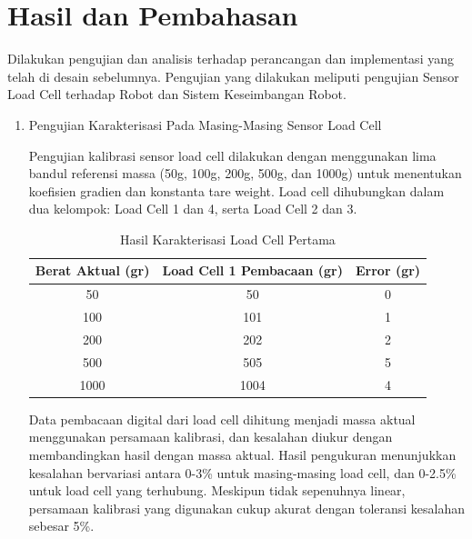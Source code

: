 \section{Hasil dan Pembahasan}
\label{sec:hasildanpembahasan}

Dilakukan pengujian dan analisis terhadap perancangan dan implementasi yang telah di desain sebelumnya. Pengujian yang dilakukan meliputi pengujian Sensor Load Cell terhadap Robot dan Sistem Keseimbangan Robot. 

\begin{enumerate}[label=\Alph*.]

    \item Pengujian Karakterisasi Pada Masing-Masing Sensor Load Cell
    \label{subsec:hasil-pembahasan-karakterisasi}

        \hspace*{1em} Pengujian kalibrasi sensor load cell dilakukan dengan menggunakan lima bandul referensi massa (50g, 100g, 200g, 500g, dan 1000g) untuk menentukan koefisien gradien dan konstanta tare weight. Load cell dihubungkan dalam dua kelompok: Load Cell 1 dan 4, serta Load Cell 2 dan 3. 

        \begin{table}[h]
            \centering
            \caption{Hasil Karakterisasi Load Cell Pertama}
            \begin{tabular}{|c|c|c|}
                \hline
                \textbf{Berat Aktual (gr)} & \textbf{Load Cell 1 Pembacaan (gr)} & \textbf{Error (gr)} \\
                \hline
                50    & 50    & 0   \\
                100   & 101   & 1   \\
                200   & 202   & 2   \\
                500   & 505   & 5   \\
                1000  & 1004  & 4   \\
                \hline
            \end{tabular}
            \label{tab:Kalibrasi_Load_Cell_1}
        \end{table}
        
        \hspace*{1em} Data pembacaan digital dari load cell dihitung menjadi massa aktual menggunakan persamaan kalibrasi, dan kesalahan diukur dengan membandingkan hasil dengan massa aktual. Hasil pengukuran menunjukkan kesalahan bervariasi antara 0-3\% untuk masing-masing load cell, dan 0-2.5\% untuk load cell yang terhubung. Meskipun tidak sepenuhnya linear, persamaan kalibrasi yang digunakan cukup akurat dengan toleransi kesalahan sebesar 5\%.


\end{enumerate}
